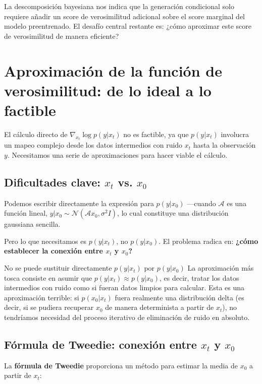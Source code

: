 \documentclass[a4paper]{article}
\begin{document}
La descomposición bayesiana nos indica que la generación condicional solo requiere añadir un score de verosimilitud adicional sobre el score marginal del modelo preentrenado. El desafío central restante es: ¿cómo aproximar este score de verosimilitud de manera eficiente?



\section{Aproximación de la función de verosimilitud: de lo ideal a lo factible}

El cálculo directo de $\nabla_{x_t} \log p(y | x_t)$ no es factible, ya que $p(y | x_t)$ involucra un mapeo complejo desde los datos intermedios con ruido $x_t$ hasta la observación $y$. Necesitamos una serie de aproximaciones para hacer viable el cálculo.

\subsection{Dificultades clave: $x_t$ vs. $x_0$}

Podemos escribir directamente la expresión para $p(y | x_0)$ —cuando $\mathcal{A}$ es una función lineal, $y | x_0 \sim \mathcal{N}(\mathcal{A} x_0, \sigma^2 I)$, lo cual constituye una distribución gaussiana sencilla.

Pero lo que necesitamos es $p(y | x_t)$, no $p(y | x_0)$. El problema radica en: \textbf{¿cómo establecer la conexión entre $x_t$ y $x_0$?}

\begin{warningbox}{No se puede sustituir directamente $p(y|x_t)$ por $p(y|x_0)$}
La aproximación más tosca consiste en asumir que $p(y|x_t) \approx p(y|x_0)$, es decir, tratar los datos intermedios con ruido como si fueran datos limpios para calcular. Esta es una aproximación terrible: si $p(x_0|x_t)$ fuera realmente una distribución delta (es decir, si se pudiera recuperar $x_0$ de manera determinista a partir de $x_t$), no tendríamos necesidad del proceso iterativo de eliminación de ruido en absoluto.
\end{warningbox}

\subsection{Fórmula de Tweedie: conexión entre $x_t$ y $x_0$}

La \textbf{fórmula de Tweedie} proporciona un método para estimar la media de $x_0$ a partir de $x_t$:
\end{document}
